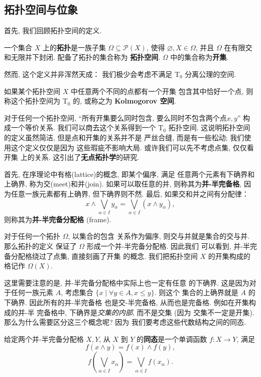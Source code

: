 \subsection{拓扑空间与位象}
首先, 我们回顾拓扑空间的定义.
\begin{definition}
一个集合 \(X\) 上的\textbf{拓扑}是一族子集 \(\Omega \subseteq \mathcal P(X)\),
使得 \(\varnothing, X \in \Omega\), 并且
\(\Omega\) 在有限交和无限并下封闭. 配备了拓扑的集合称为%
\textbf{拓扑空间}. \(\Omega\) 中的集合称为\textbf{开集}.
\end{definition}
然而, 这个定义并非浑然天成： 我们极少会考虑不满足 T\(_0\)
分离公理的空间.
\begin{definition}
如果某个拓扑空间 \(X\) 中任意两个不同的点都有一个开集
包含其中恰好一个点, 则称这个拓扑空间为 T\(_0\) 的,
或称之为 \textbf{Kolmogorov 空间}.
\end{definition}
对于任何一个拓扑空间, “所有开集要么同时包含, 要么同时不包含两个点\(x,y\)”
构成一个等价关系. 我们可以商去这个关系得到一个 T\(_0\) 拓扑空间.
这说明拓扑空间的定义虽然简洁, 但是点和开集的关系并不是
严丝合缝, 而是有一些松动; 我们使用这个定义仅仅是因为
这些瑕疵不影响大局. 或许我们可以先不考虑点集, 仅仅看开集
上的关系. 这引出了\textbf{无点拓扑学}的研究.

首先, 在序理论中有格(lattice)的概念, 即某个偏序, 满足
任意两个元素有下确界和上确界, 称为交(meet)和并(join).
如果可以取任意的并, 则称其为\textbf{并-半完备格},
因为任意一族元素都有上确界, 但下确界则不然.
最后, 如果交和并之间有分配律：
\[x \wedge \bigvee_{\alpha \in I} y_\alpha
= \bigvee_{\alpha \in I} (x \wedge y_\alpha),\]
则称其为\textbf{并-半完备分配格} (frame).

对于任何一个拓扑 \(\Omega\), 以集合的包含
关系作为偏序, 则交与并就是集合的交与并. 那么拓扑的定义
保证了 \(\Omega\) 形成一个并-半完备分配格. 因此我们
可以看到, 并-半完备分配格绕过了点集, 直接刻画了开集
的概念. 我们把拓扑空间 \(X\) 的开集构成的格记作 \(\Omega(X)\).

这里需要注意的是, 并-半完备分配格中实际上也一定有任意
的下确界. 这是因为对于任何一族元素 \(A\), 考虑集合
\(\{x \mid \forall y \in A, x \le y\}\). 则这个
集合的上确界就是 \(A\) 的下确界. 因此所有的并-半完备格
也是交-半完备格, 从而也是完备格. 例如在开集构成的并-半
完备格中, 下确界是\emph{交集的内部}, 而不是交集 (因为
交集不一定是开集). 那么为什么需要区分这三个概念呢? 因为
我们要考虑这些代数结构之间的同态.

\begin{definition}
给定两个并-半完备分配格 \(X, Y\), 从 \(X\) 到 \(Y\)
的\textbf{同态}是一个单调函数 \(f : X \to Y\), 满足
\[f(x\wedge y) = f(x) \wedge f(y),\]
\[f\left(\bigvee_{\alpha \in I} x_\alpha\right)
= \bigvee_{\alpha \in I} f(x_\alpha).\]
\end{definition}

